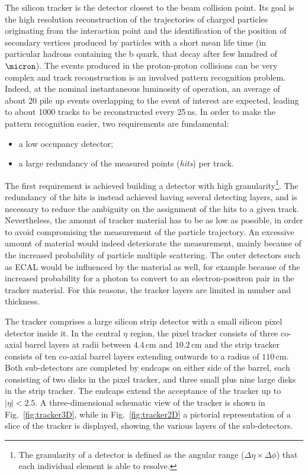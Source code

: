 The silicon tracker is the detector closest to the beam collision point. Its goal is the high resolution reconstruction of the trajectories of charged particles originating from the interaction point and the identification of the position of secondary vertices produced by particles with a short mean life time (in particular hadrons containing the b quark, that decay after few hundred of $\micron$). The events produced in the proton-proton collisions can be very complex and track reconstruction is an involved pattern recognition problem. Indeed, at the nominal instantaneous luminosity of operation, an average of about 20 pile up events overlapping to the event of interest are expected, leading to about 1000 tracks to be reconstructed every 25\,ns. In order to make the pattern recognition easier, two requirements are fundamental:
\begin{itemize}
\item a low occupancy detector;
\item a large redundancy of the measured points (\emph{hits}) per track.
\end{itemize}
The first requirement is achieved building a detector with high granularity\footnote{The granularity of a detector is defined as the angular range ($\Delta\eta\times\Delta\phi$) that each individual element is able to resolve.}. The redundancy of the hits is instead achieved having several detecting layers, and is necessary to reduce the ambiguity on the assignment of the hits to a given track. Nevertheless, the amount of tracker material has to be as low as possible, in order to avoid compromising the measurement of the particle trajectory. An excessive amount of material would indeed deteriorate the measurement, mainly because of the increased probability of particle multiple scattering. The outer detectors such as ECAL would be influenced by the material as well, for example because of the increased probability for a photon to convert to an electron-positron pair in the tracker material. For this reasons, the tracker layers are limited in number and thickness.

The tracker comprises a large silicon strip detector with a small silicon pixel detector inside it. In the central $\eta$ region, the pixel tracker consists of three co-axial barrel layers at radii between $4.4$\,cm and $10.2$\,cm and the strip tracker consists of ten co-axial barrel layers extending outwards to a radius of $110$\,cm. Both sub-detectors are completed by endcaps on either
side of the barrel, each consisting of two disks in the pixel tracker, and three small plus nine large disks in the strip tracker. The endcaps extend the acceptance of the tracker up to $|\eta|<2.5$. A three-dimensional schematic view of the tracker is shown in Fig.~\ref{fig:tracker3D}, while in Fig.~\ref{fig:tracker2D} a pictorial representation of a slice of the tracker is displayed, showing the various layers of the sub-detectors.

